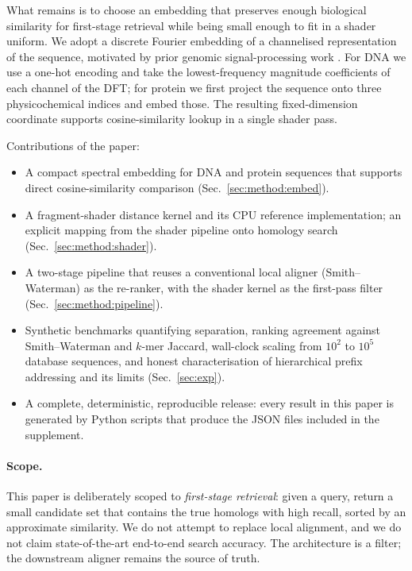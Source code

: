 \documentclass[twocolumn,11pt,a4paper]{article}
\theoremstyle{definition}
\theoremstyle{remark}
\begin{document}
What remains is to choose an embedding that preserves enough biological
similarity for first-stage retrieval while being small enough to fit in a
shader uniform. We adopt a discrete Fourier embedding of a channelised
representation of the sequence, motivated by prior genomic signal-processing
work \citep{anastassiou2001,voss1992,hoang2015}. For DNA we use a one-hot
encoding and take the lowest-frequency magnitude coefficients of each channel
of the DFT; for protein we first project the sequence onto three
physicochemical indices \citep{kyte1982,fauchere1988} and embed those. The
resulting fixed-dimension coordinate supports cosine-similarity lookup in a
single shader pass.

Contributions of the paper:

\begin{itemize}
    \item A compact spectral embedding for DNA and protein sequences that
    supports direct cosine-similarity comparison (Sec.~\ref{sec:method:embed}).
    \item A fragment-shader distance kernel and its CPU reference
    implementation; an explicit mapping from the shader pipeline onto
    homology search (Sec.~\ref{sec:method:shader}).
    \item A two-stage pipeline that reuses a conventional local aligner
    (Smith--Waterman) as the re-ranker, with the shader kernel as the
    first-pass filter (Sec.~\ref{sec:method:pipeline}).
    \item Synthetic benchmarks quantifying separation, ranking agreement
    against Smith--Waterman and $k$-mer Jaccard, wall-clock scaling from
    $10^2$ to $10^5$ database sequences, and honest characterisation of
    hierarchical prefix addressing and its limits (Sec.~\ref{sec:exp}).
    \item A complete, deterministic, reproducible release: every result in
    this paper is generated by Python scripts that produce the JSON files
    included in the supplement.
\end{itemize}

\paragraph{Scope.} This paper is deliberately scoped to \emph{first-stage
retrieval}: given a query, return a small candidate set that contains the
true homologs with high recall, sorted by an approximate similarity. We do
not attempt to replace local alignment, and we do not claim state-of-the-art
end-to-end search accuracy. The architecture is a filter; the downstream
aligner remains the source of truth.
\end{document}
